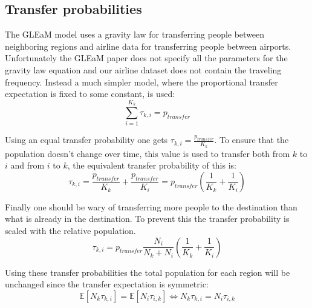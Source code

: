 \subsection{Transfer probabilities}

The GLEaM model \cite{GLEaM} uses a gravity law for transferring people between neighboring regions and airline data for transferring people between airports. Unfortunately the GLEaM paper does not specify all the parameters for the gravity law equation and our airline dataset does not contain the traveling frequency. Instead a much simpler model, where the proportional transfer expectation is fixed to some constant, is used:
\begin{equation}
\sum_{i = 1}^{K_k} \tau_{k, i} = p_{transfer}
\end{equation}

Using an equal transfer probability one gets $\tau_{k, i} = \frac{p_{transfer}}{K_k}$. To ensure that the population doesn't change over time, this value is used to transfer both from $k$ to $i$ and from $i$ to $k$, the equivalent transfer probability of this is:
\begin{equation}
\tau_{k, i} = \frac{p_{transfer}}{K_k} + \frac{p_{transfer}}{K_i} = p_{transfer} \left(\frac{1}{K_k} + \frac{1}{K_i}\right)
\end{equation}

Finally one should be wary of transferring more people to the destination than what is already in the destination. To prevent this the transfer probability is scaled with the relative population.
\begin{equation}
\tau_{k, i} = p_{transfer} \frac{N_i}{N_k + N_i} \left(\frac{1}{K_k} + \frac{1}{K_i}\right)
\end{equation}

Using these transfer probabilities the total population for each region will be unchanged since the transfer expectation is symmetric:
\begin{equation}
\mathbb{E}[N_k \tau_{k, i}] = \mathbb{E}[N_i \tau_{i, k}] \Leftrightarrow N_k \tau_{k, i} = N_i \tau_{i, k}
\end{equation}
